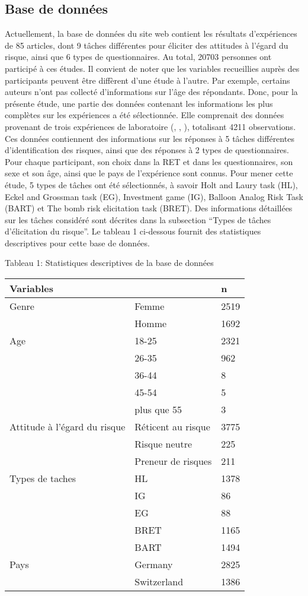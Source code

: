 \documentclass[12pt]{article}
\begin{document}
\subsection{Base de données}

Actuellement, la base de données du site web contient les résultats
d'expériences de 85 articles, dont 9 tâches différentes pour éliciter
des attitudes à l'égard du risque, ainsi que 6 types de questionnaires.
Au total, 20703 personnes ont participé à ces études. Il convient de
noter que les variables recueillies auprès des participants peuvent être
diffèrent d'une étude à l'autre. Par exemple, certains auteurs n'ont pas
collecté d'informations sur l'âge des répondants. Donc, pour la présente
étude, une partie des données contenant les informations les plus
complètes sur les expériences a été sélectionnée. Elle comprenait des
données provenant de trois expériences de laboratoire
(\citet{Crosetto2013}, \citet{Crosetto2016}, \citet{Frey2017}),
totalisant 4211 observations. Ces données contiennent des informations
sur les réponses à 5 tâches différentes d'identification des risques,
ainsi que des réponses à 2 types de questionnaires. Pour chaque
participant, son choix dans la RET et dans les questionnaires, son sexe
et son âge, ainsi que le pays de l'expérience sont connus. Pour mener
cette étude, 5 types de tâches ont été sélectionnés, à savoir Holt and
Laury task (HL), Eckel and Grossman task (EG), Investment game (IG),
Balloon Analog Risk Task (BART) et The bomb risk elicitation task
(BRET). Des informations détaillées sur les tâches considéré sont
décrites dans la subsection ``Types de tâches d'élicitation du risque''.
Le tableau 1 ci-dessous fournit des statistiques descriptives pour cette
base de données.

Tableau 1: Statistiques descriptives de la base de données

\begin{longtable}[]{@{}lll@{}}
\toprule
Variables & & n \\
\midrule
\endhead
Genre & Femme & 2519 \\
& Homme & 1692 \\
Age & 18-25 & 2321 \\
& 26-35 & 962 \\
& 36-44 & 8 \\
& 45-54 & 5 \\
& plus que 55 & 3 \\
Attitude à l'égard du risque & Réticent au risque & 3775 \\
& Risque neutre & 225 \\
& Preneur de risques & 211 \\
Types de taches & HL & 1378 \\
& IG & 86 \\
& EG & 88 \\
& BRET & 1165 \\
& BART & 1494 \\
Pays & Germany & 2825 \\
& Switzerland & 1386 \\
\bottomrule
\end{longtable}
\end{document}
